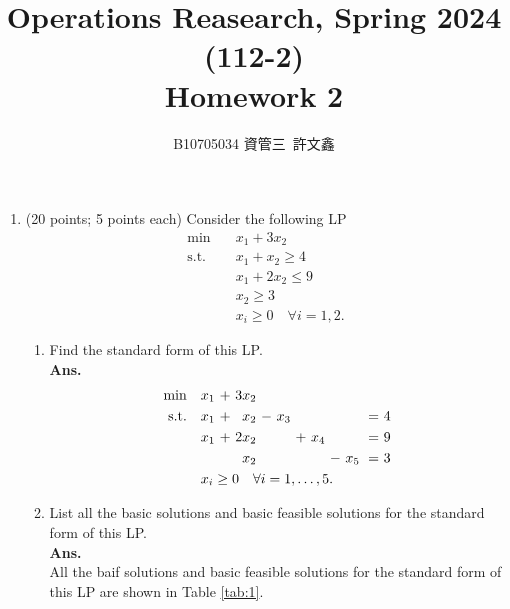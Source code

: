 \documentclass[12pt]{article}
\title{Operations Reasearch, Spring 2024 (112-2)\\ Homework 2}
\author{B10705034 資管三\ 許文鑫}
\begin{document}
\maketitle
\begin{enumerate}
      \item (20 points; 5 points each) Consider the following LP
            \begin{align*}
                  \min \quad        & x_1 + 3x_2                        \\
                  \text{s.t.} \quad & x_1 + x_2 \geq 4                  \\
                                    & x_1 + 2x_2 \leq 9                 \\
                                    & x_2 \geq 3                        \\
                                    & x_i \geq 0 \quad \forall i = 1,2.
            \end{align*}
            \begin{enumerate}
                  \item Find the standard form of this LP.\\
                        \textbf{Ans.}
                        \begin{equation*}
                              \begin{alignedat}{10}
                                    \min \quad       &  & x_1 & \ +\  & 3x_2             \\
                                    \text{s.t.} \quad &  & x_1 & \ +\  & x_2  & \ -\  & x_3 &&&&& \ =\  & 4 \\
                                    && x_1 & \ +\  & 2x_2 & & &\ +\  & x_4 & & & \ =\  & 9\\
                                    && & & x_2 & & & & & \ -\  & x_5 & \ =\  & 3 \\
                                    & \mathrlap{x_i \geq 0\quad \forall i=1,\dots ,5.}
                              \end{alignedat}
                        \end{equation*}
                  \item List all the basic solutions and basic feasible solutions for the standard form of this LP.\\
                        \textbf{Ans.}\\
                        All the baif solutions and basic feasible solutions for the standard form of this LP are shown in Table \ref{tab:1}.

\end{enumerate}
\end{enumerate}
\end{document}

